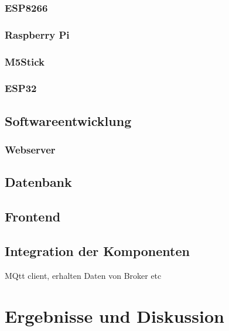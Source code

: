 \documentclass[12pt, letterpaper]{article}
\begin{document}
  \subsubsection{ESP8266}
  \subsubsection{Raspberry Pi}
  \subsubsection{M5Stick}
  \subsubsection{ESP32}

\subsection{Softwareentwicklung}
  \subsubsection{Webserver}
  \subsection{Datenbank}
  \subsection{Frontend}
  \subsection{Integration der Komponenten}
  \par MQtt client, erhalten Daten von Broker etc

\newpage
\section{Ergebnisse und Diskussion}

\newpage
\end{document}
